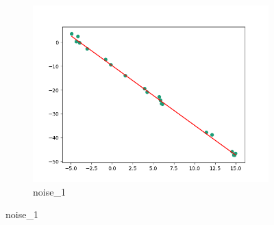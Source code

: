 \documentclass[notitlepage, 11pt]{report}
\begin{document}
\begin{figure}[H]
\begin{subfigure}{0.25\textwidth}
					\includegraphics[width=\linewidth]{Figure_6}
					\caption{noise\_1}
					\label{fig:6}
				\end{subfigure}
			

\end{figure}
\end{document}
